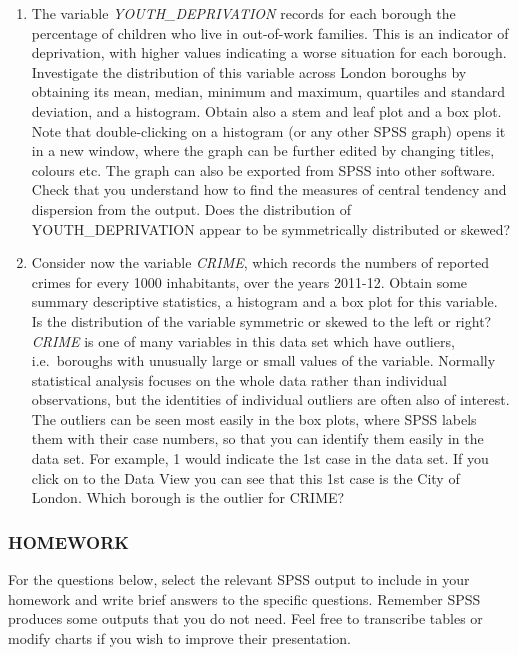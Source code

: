 \documentclass[11pt,a4paper,openany]{book}
\begin{document}
\begin{enumerate}
\def\labelenumi{\arabic{enumi}.}
\item
  The variable \emph{YOUTH\_DEPRIVATION} records for each borough the
  percentage of children who live in out-of-work families. This is an
  indicator of deprivation, with higher values indicating a worse
  situation for each borough. Investigate the distribution of this
  variable across London boroughs by obtaining its mean, median, minimum
  and maximum, quartiles and standard deviation, and a histogram. Obtain
  also a stem and leaf plot and a box plot. Note that double-clicking on
  a histogram (or any other SPSS graph) opens it in a new window, where
  the graph can be further edited by changing titles, colours etc. The
  graph can also be exported from SPSS into other software. Check that
  you understand how to find the measures of central tendency and
  dispersion from the output. Does the distribution of
  YOUTH\_DEPRIVATION appear to be symmetrically distributed or skewed?
\item
  Consider now the variable \emph{CRIME}, which records the numbers of
  reported crimes for every 1000 inhabitants, over the years 2011-12.
  Obtain some summary descriptive statistics, a histogram and a box plot
  for this variable. Is the distribution of the variable symmetric or
  skewed to the left or right? \emph{CRIME} is one of many variables in
  this data set which have outliers, i.e.~boroughs with unusually large
  or small values of the variable. Normally statistical analysis focuses
  on the whole data rather than individual observations, but the
  identities of individual outliers are often also of interest. The
  outliers can be seen most easily in the box plots, where SPSS labels
  them with their case numbers, so that you can identify them easily in
  the data set. For example, 1 would indicate the 1st case in the data
  set. If you click on to the Data View you can see that this 1st case
  is the City of London. Which borough is the outlier for CRIME?
\end{enumerate}

\subsubsection*{HOMEWORK}\label{homework-1}

For the questions below, select the relevant SPSS output to include in
your homework and write brief answers to the specific questions.
Remember SPSS produces some outputs that you do not need. Feel free to
transcribe tables or modify charts if you wish to improve their
presentation.
\end{document}

